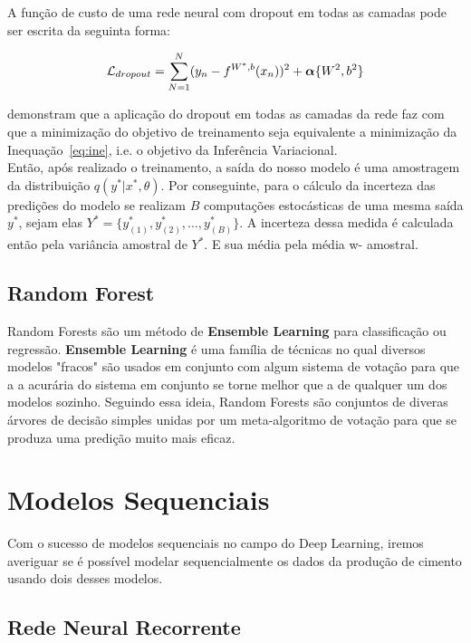 A função de custo de uma rede neural com dropout em todas as camadas pode ser escrita da seguinta forma:

\[     \mathcal{L}_{dropout} = \sum^N_{N=1} (y_n - \mathnormal{f}^{W^*,b}(x_n))^2 + \boldsymbol{\alpha}\{W^2,b^2\} \]


\cite{dropbayes} demonstram que a aplicação do dropout em todas as camadas da rede faz com que a minimização
do objetivo de treinamento seja equivalente a minimização da Inequação~\ref{eq:ine}, i.e. o objetivo da Inferência Variacional.\\

Então, após realizado o treinamento, a saída do nosso modelo é uma amostragem da distribuição $q(y^* | x^* , \theta)$.
Por conseguinte, para o cálculo da incerteza das predições do modelo se realizam $B$ computações estocásticas de uma mesma
saída $y^*$, sejam elas $Y^* = \{y^*_{(1)},y^*_{(2)}, \dots , y^*_{(B)}\}$. A incerteza
dessa medida é calculada então pela variância amostral de $Y^*$. E sua média pela média w- amostral.



\subsection{Random Forest}

Random Forests são um método de \textbf{Ensemble Learning} para classificação ou regressão. \textbf{Ensemble Learning} é uma família de técnicas no qual diversos modelos "fracos" são usados em conjunto com algum sistema de votação para que a a acurária do sistema em conjunto se torne melhor que a de qualquer um dos modelos sozinho. Seguindo essa ideia, Random Forests são conjuntos de diveras árvores de decisão simples unidas por um meta-algoritmo de votação para que se produza uma predição muito mais eficaz.


\section{Modelos Sequenciais}
Com o sucesso de modelos sequenciais no campo do Deep Learning, iremos averiguar se é possível modelar sequencialmente os dados da produção de cimento usando dois desses modelos. 
\\

\subsection{Rede Neural Recorrente}
% 

